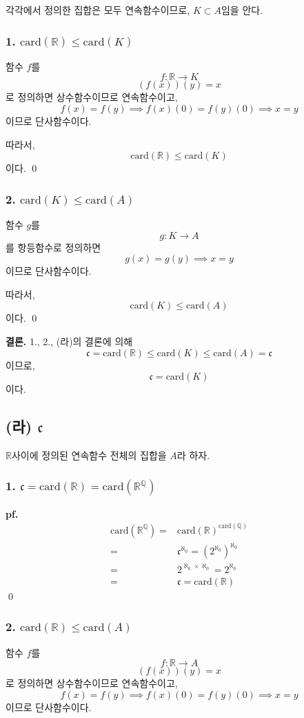 \documentclass{article}
\begin{document}
각각에서 정의한 집합은 모두 연속함수이므로, $K \subset A$임을 안다.

\subsubsection{1. $\text{card}(\mathbb{R}) \le \text{card}(K)$}
함수 $f$를
$$f : \mathbb{R} \rightarrow K$$
$$(f(x))(y) = x$$
로 정의하면 상수함수이므로 연속함수이고, 
$$f(x) = f(y) \implies f(x)(0) = f(y)(0) \implies x = y$$이므로 단사함수이다.

따라서, $$\text{card}(\mathbb{R}) \le \text{card}(K)$$이다. \qed

\subsubsection{2. $\text{card}(K) \le \text{card}(A)$}
함수 $g$를
$$g : K \rightarrow A$$
를 항등함수로 정의하면
$$g(x) = g(y) \implies x = y$$이므로 단사함수이다.

따라서, $$\text{card}(K) \le \text{card}(A)$$이다. \qed

\textbf{결론.} 1., 2., (라)의 결론에 의해
$$\mathfrak{c} = \text{card}(\mathbb{R}) \le \text{card}(K) \le \text{card}(A) = \mathfrak{c}$$
이므로,
$$\mathfrak{c} = \text{card}(K)$$이다.


\subsection{(라) $\mathfrak{c}$}

$\mathbb{R}$사이에 정의된 연속함수 전체의 집합을 $A$라 하자. 
\subsubsection{1. $\mathfrak{c} = \text{card}(\mathbb{R}) = \text{card}(\mathbb{R}^{\mathbb{Q}})$}
\textbf{pf.}
\begin{align*}
\text{card}(\mathbb{R}^{\mathbb{Q}}) =& \text{card}(\mathbb{R})^{\text{card}(\mathbb{Q})}
\\ =& \mathfrak{c} ^ {\aleph_0} = (2^{\aleph_0}) ^ {\aleph_0}
\\ =& 2^{\aleph_0 \times \aleph_0} = 2^{\aleph_0}
\\ =& \mathfrak{c} = \text{card}(\mathbb{R})
\end{align*} \qed


\subsubsection{2. $\text{card}(\mathbb{R}) \le \text{card}(A)$}
함수 $f$를
$$f : \mathbb{R} \rightarrow A$$
$$(f(x))(y) = x$$
로 정의하면 상수함수이므로 연속함수이고, 
$$f(x) = f(y) \implies f(x)(0) = f(y)(0) \implies x = y$$이므로 단사함수이다.
\end{document}
